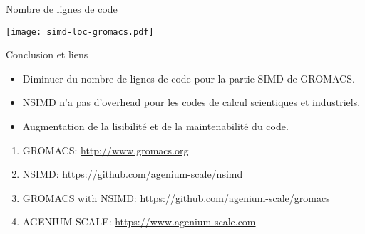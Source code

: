 \documentclass[shrink, compress, mathserif, 10pt, xcolor=dvipsnames,
               aspectratio=169]{beamer}
\begin{document}
\begin{frame}{Nombre de lignes de code}
  \begin{center}
    \texttt{[image: simd-loc-gromacs.pdf]}
  \end{center}
\end{frame}

\begin{frame}{Conclusion et liens}
  \begin{itemize}
    \item
      Diminuer du nombre de lignes de code pour la partie SIMD de GROMACS.
    \item
      NSIMD n'a pas d'overhead pour les codes de calcul scientiques et
      industriels.
    \item
      Augmentation de la lisibilité et de la maintenabilité du code.  
  \end{itemize}

  \begin{enumerate}
    \item GROMACS: \url{http://www.gromacs.org}
    \item NSIMD: \url{https://github.com/agenium-scale/nsimd}
    \item GROMACS with NSIMD: \url{https://github.com/agenium-scale/gromacs}
    \item AGENIUM SCALE: \url{https://www.agenium-scale.com}
  \end{enumerate}
\end{frame}
\end{document}

